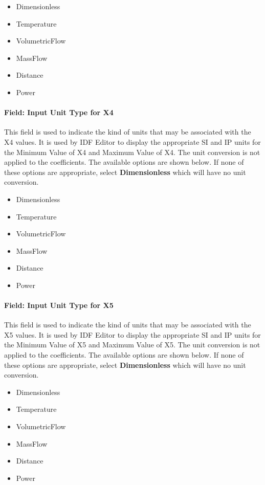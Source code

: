 \begin{itemize}
\item
  Dimensionless
\item
  Temperature
\item
  VolumetricFlow
\item
  MassFlow
\item
  Distance
\item
  Power
\end{itemize}

\paragraph{Field: Input Unit Type for X4}\label{field-input-unit-type-for-x4}

This field is used to indicate the kind of units that may be associated with the X4 values. It is used by IDF Editor to display the appropriate SI and IP units for the Minimum Value of X4 and Maximum Value of X4. The unit conversion is not applied to the coefficients. The available options are shown below. If none of these options are appropriate, select \textbf{Dimensionless} which will have no unit conversion.

\begin{itemize}
\item
  Dimensionless
\item
  Temperature
\item
  VolumetricFlow
\item
  MassFlow
\item
  Distance
\item
  Power
\end{itemize}

\paragraph{Field: Input Unit Type for X5}\label{field-input-unit-type-for-x5}

This field is used to indicate the kind of units that may be associated with the X5 values. It is used by IDF Editor to display the appropriate SI and IP units for the Minimum Value of X5 and Maximum Value of X5. The unit conversion is not applied to the coefficients. The available options are shown below. If none of these options are appropriate, select \textbf{Dimensionless} which will have no unit conversion.

\begin{itemize}
\item
  Dimensionless
\item
  Temperature
\item
  VolumetricFlow
\item
  MassFlow
\item
  Distance
\item
  Power
\end{itemize}

